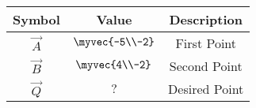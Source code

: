 \begin{tabular}{|c|c|c|}
\hline
\textbf{Symbol} & \textbf{Value} & \textbf{Description}\\
\hline
$\vec{A}$ & $\myvec{-5\\-2}$ & First Point\\
\hline
$\vec{B}$ & $\myvec{4\\-2}$ & Second Point\\
\hline
$\vec{Q}$ & $?$ & Desired Point\\
\hline
\end{tabular}
